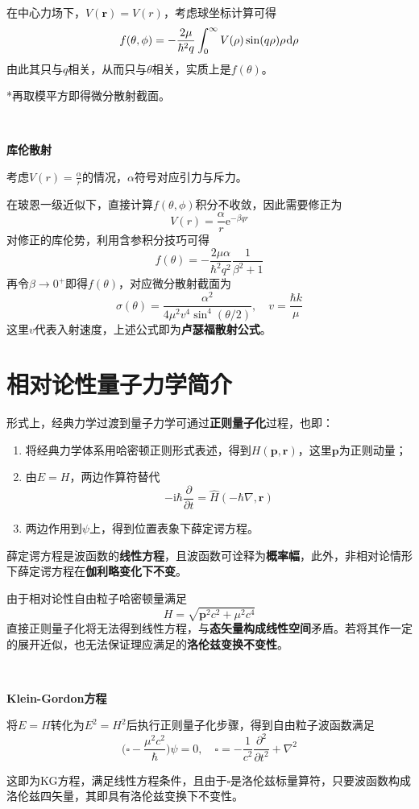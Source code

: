 \documentclass[a4paper,UTF8,fontset=windows]{ctexart}
\newcommand*{\dr}{\hspace{0.07em}\mathrm{d}}
\newcommand*{\ir}{\mathrm{i}}
\newcommand*{\er}{\mathrm{e}}
\newcommand*{\br}{\mathbf{r}}
\newcommand*{\bp}{\mathbf{p}}
\begin{document}
在中心力场下，$V(\br)=V(r)$，考虑球坐标计算可得
$$f(\theta,\phi)=-\frac{2\mu}{\hbar^2q}\int_0^\infty V(\rho)\sin(q\rho)\rho\dr\rho$$
由此其只与$q$相关，从而只与$\theta$相关，实质上是$f(\theta)$。

*再取模平方即得微分散射截面。

\

\textbf{库伦散射}

考虑$V(r)=\frac{\alpha}{r}$的情况，$\alpha$符号对应引力与斥力。

在玻恩一级近似下，直接计算$f(\theta,\phi)$积分不收敛，因此需要修正为
$$V(r)=\frac{\alpha}{r}\er^{-\beta qr}$$
对修正的库伦势，利用含参积分技巧可得
$$f(\theta)=-\frac{2\mu\alpha}{\hbar^2q^2}\frac{1}{\beta^2+1}$$
再令$\beta\to0^+$即得$f(\theta)$，对应微分散射截面为
$$\sigma(\theta)=\frac{\alpha^2}{4\mu^2v^4\sin^4(\theta/2)},\quad v=\frac{\hbar k}{\mu}$$
这里$v$代表入射速度，上述公式即为\textbf{卢瑟福散射公式}。

\section{相对论性量子力学简介}
形式上，经典力学过渡到量子力学可通过\textbf{正则量子化}过程，也即：
\begin{enumerate}
    \item 将经典力学体系用哈密顿正则形式表述，得到$H(\bp,\br)$，这里$\bp$为正则动量；
    \item 由$E=H$，两边作算符替代
    $$-\ir\hbar\frac{\partial}{\partial t}=\hat{H}(-\hbar\nabla,\br)$$
    \item 两边作用到$\psi$上，得到位置表象下薛定谔方程。
\end{enumerate}
薛定谔方程是波函数的\textbf{线性方程}，且波函数可诠释为\textbf{概率幅}，此外，非相对论情形下薛定谔方程在\textbf{伽利略变化下不变}。

由于相对论性自由粒子哈密顿量满足
$$H=\sqrt{\bp^2c^2+\mu^2c^4}$$
直接正则量子化将无法得到线性方程，与\textbf{态矢量构成线性空间}矛盾。若将其作一定的展开近似，也无法保证理应满足的\textbf{洛伦兹变换不变性}。

\

\textbf{Klein-Gordon方程}

将$E=H$转化为$E^2=H^2$后执行正则量子化步骤，得到自由粒子波函数满足
$$\bigg(\square-\frac{\mu^2c^2}{\hbar}\bigg)\psi=0,\quad\square=-\frac{1}{c^2}\frac{\partial^2}{\partial t^2}+\nabla^2$$

这即为KG方程，满足线性方程条件，且由于$\square$是洛伦兹标量算符，只要波函数构成洛伦兹四矢量，其即具有洛伦兹变换下不变性。
\end{document}
